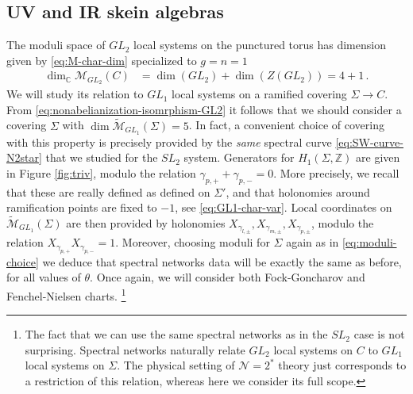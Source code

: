 \documentclass{article}
\numberwithin{equation}{section}
\newcommand{\IC}{\mathbb{C}}
\newcommand{\IZ}{\mathbb{Z}}
\def\be{\begin{equation}}
\def\ee{\end{equation}}
\def\IZ{{\mathbb{Z}}}
\def\IC{{\mathbb{C}}}
\def\CM{{\mathcal{M}}}
\def\CN{{\mathcal{N}}}
\begin{document}
\subsection{UV and IR skein algebras}\label{sec:gl2-coordinate-systems}
The moduli space of ${GL}_2$ local systems on the punctured torus has dimension given by \eqref{eq:M-char-dim} specialized to $g=n=1$
\be
\begin{split}
	\dim_{\IC}\CM_{GL_2}(C) & = \dim(GL_2)+\dim(Z(GL_2))=4+1\,.
\end{split}
\ee
We will study its relation to $GL_1$ local systems on a ramified covering $\Sigma\to C$.
From \eqref{eq:nonabelianization-isomrphism-GL2} it follows that we should consider a covering $\Sigma$ with $\dim \tilde \CM_{GL_1}(\Sigma) = 5$.
In fact, a convenient choice of covering with this property is precisely provided by the \textit{same} spectral curve \eqref{eq:SW-curve-N2star} that we studied for the $SL_2$ system. 
Generators for $H_1(\Sigma,\IZ)$ are given in Figure \ref{fig:triv}, modulo the relation $\gamma_{p,+}+\gamma_{p,-}=0$.
More precisely, we recall that these are really defined as defined on $\Sigma'$, and that holonomies around ramification points are fixed to $-1$, see \eqref{eq:GL1-char-var}.
Local coordinates on $\tilde \CM_{GL_1}(\Sigma)$ are then provided by holonomies $X_{\gamma_{l,\pm}}, X_{\gamma_{m,\pm}}, X_{\gamma_{p,\pm}}$, modulo the relation $X_{\gamma_{p,+}}X_{\gamma_{p,-}}=1$. 
Moreover, choosing moduli for $\Sigma$ again as in \eqref{eq:moduli-choice} we deduce that
spectral networks data will be exactly the same as before, for all values of $\theta$. 
Once again, we will consider both Fock-Goncharov and Fenchel-Nielsen charts.%
\footnote{The fact that we can use the same spectral networks as in the $SL_2$ case is not surprising. Spectral networks naturally relate $GL_2$ local systems on $C$ to $GL_1$ local systems on $\Sigma$. The physical setting of $\CN=2^*$ theory just corresponds to a restriction of this relation, whereas here we consider its full scope.}



\end{document}
